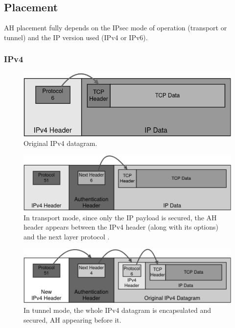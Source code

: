 \documentclass[a4paper,12pt]{report}
\begin{document}
		\subsection{Placement}
		AH placement fully depends on the IPsec mode of operation (transport or tunnel) and the IP version used (IPv4 or IPv6).
		\subsubsection{IPv4}
		\begin{figure}[h]
			\includegraphics[width=\textwidth,height=0.11\textheight,keepaspectratio]{original_ipv4_packet}
			\centering
			\caption{Original IPv4 datagram.}
		\end{figure}
		
		\begin{figure}[h]
			\includegraphics[width=\textwidth]{ah_ipv4_transport}
			\centering
			\caption{In transport mode, since only the IP payload is secured, the AH header appears between the IPv4 header (along with its options) and the next layer protocol \cite{rfc4302}.}
		\end{figure}
		
		\begin{figure}[!h]
			\includegraphics[width=\textwidth]{ah_ipv4_tunnel}
			\centering
			\caption{In tunnel mode, the whole IPv4 datagram is encapsulated and secured, AH appearing before it.}
		\end{figure}
		
\end{document}
